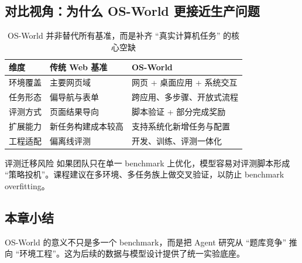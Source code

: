 \subsection{对比视角：为什么 OS-World 更接近生产问题}
\begin{table}[H]
\centering
\begin{tabular}{p{3.2cm}p{3.7cm}p{3.8cm}}
\toprule
\textbf{维度} & \textbf{传统 Web 基准} & \textbf{OS-World} \\
\midrule
环境覆盖 & 主要网页域 & 网页 + 桌面应用 + 系统交互 \\
任务形态 & 偏导航与表单 & 跨应用、多步骤、开放式流程 \\
评测方式 & 页面结果导向 & 脚本验证 + 部分完成奖励 \\
扩展能力 & 新任务构建成本较高 & 支持系统化新增任务与配置 \\
工程适配 & 偏离线评测 & 开发、训练、评测一体化 \\
\bottomrule
\end{tabular}
\caption{OS-World 并非替代所有基准，而是补齐 ``真实计算机任务'' 的核心空缺}
\end{table}

\begin{warningbox}{评测迁移风险}
如果团队只在单一 benchmark 上优化，模型容易对评测脚本形成 ``策略投机''。课程建议在多环境、多任务族上做交叉验证，以防止 benchmark overfitting。
\end{warningbox}

\subsection{本章小结}
OS-World 的意义不只是多一个 benchmark，而是把 Agent 研究从 ``题库竞争'' 推向 ``环境工程''。这为后续的数据与模型设计提供了统一实验底座。

